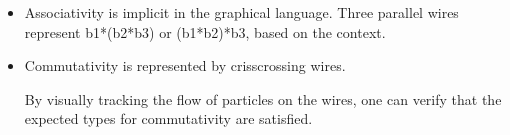 \documentclass[preprint]{sigplanconf}
\begin{document}
\begin{itemize}
\item Associativity is implicit in the graphical language. Three parallel
  wires represent {{b1*(b2*b3)}} or {{(b1*b2)*b3}}, based on the context.
\begin{center}
\end{center}

\item Commutativity is represented by crisscrossing wires.
\begin{multicols}{2}
\begin{center}
\end{center}
\begin{center}
\end{center}
\end{multicols}

By visually tracking the flow of particles on the wires, one can
verify that the expected types for commutativity are satisfied.

\begin{multicols}{2}
\begin{center}
\end{center}
\begin{center}
\end{center}
\end{multicols}


\end{itemize}
\end{document}
